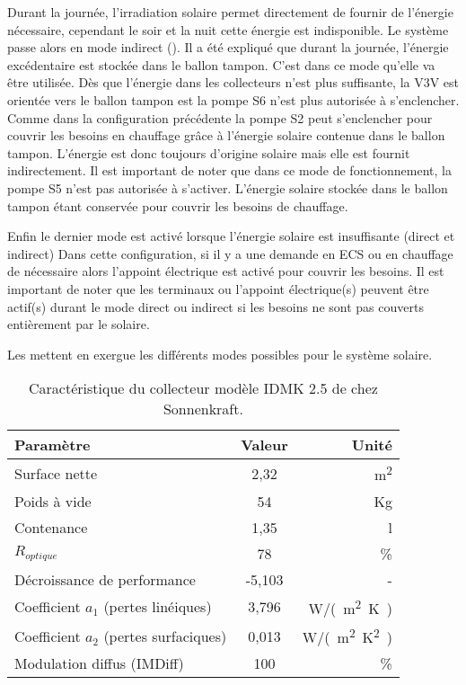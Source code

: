 Durant la journée, l’irradiation solaire permet directement de fournir de l’énergie
nécessaire, cependant le soir et la nuit cette énergie est indisponible. Le système
passe alors en mode indirect (). Il a été expliqué
que durant la journée, l’énergie excédentaire est stockée dans le ballon tampon. C’est
dans ce mode qu’elle va être utilisée. Dès que l’énergie dans les collecteurs n’est
plus suffisante, la V3V est orientée vers le ballon tampon est la pompe S6 n’est
plus autorisée à s’enclencher. Comme dans la configuration précédente la pompe S2
peut s’enclencher pour couvrir les besoins en chauffage grâce à l’énergie solaire
contenue dans le ballon tampon. L’énergie est donc toujours d’origine solaire mais
elle est fournit indirectement. Il est important de noter que dans ce mode de fonctionnement,
la pompe S5 n’est pas autorisée à s’activer. L’énergie solaire stockée dans le ballon tampon
étant conservée pour couvrir les besoins de chauffage.

Enfin le dernier mode est activé lorsque l’énergie solaire est insuffisante (direct et indirect)
Dans cette configuration, si il y a une demande en ECS ou en chauffage de nécessaire alors
l’appoint électrique est activé pour couvrir les besoins. Il est important de noter que
les terminaux ou l’appoint électrique(s) peuvent être actif(s) durant le mode direct ou
indirect si les besoins ne sont pas couverts entièrement par le solaire.


Les  mettent en exergue les différents modes possibles
pour le système solaire.



\begin{table}
\centering
\begin{tabular}{lcr}
    \toprule
    Paramètre                                & Valeur         & Unité                 \\
    \midrule
    Surface nette                            & 2,32           & \si{m^{2}}            \\
    Poids à vide                             & 54             & \si{Kg}               \\
    Contenance                               & 1,35           & \si{l}                \\
    $R_{optique}$                            & 78             & \si{\%}               \\
    Décroissance de performance              & -5,103         & -                     \\
    Coefficient $a_{1}$ (pertes linéiques)   & 3,796          & \si{W/(m^{2}.K)}      \\
    Coefficient $a_{2}$ (pertes surfaciques) & 0,013          & \si{W/(m^{2}.K^{2})}  \\
    Modulation diffus (IMDiff)               & 100            & \si{\%}               \\
    \bottomrule
\end{tabular}
\caption{Caractéristique du collecteur modèle IDMK 2.5 de chez Sonnenkraft.
         \label{tab:collectors_specs}}
\end{table}

